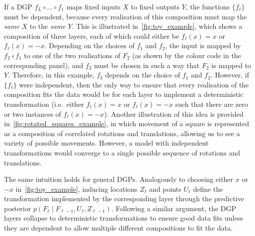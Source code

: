 If a DGP $f_L \circ \ldots \circ f_1$ maps fixed inputs $X$ to fixed outputs $Y$, the functions $\{f_\ell\}$ must be dependent, because every realisation of this composition must map the \emph{same} $X$ to the \emph{same} $Y$.
This is illustrated in~\cref{fig:toy_example}, which shows a composition of three layers, each of which could either be $f_\ell(x) = x$ or $f_\ell(x) = -x$.
Depending on the choices of $f_1$ and $f_2$, the input is mapped by $f_2 \circ f_1$ to one of the two realisations of $F_2$ (as shown by the colour code in the corresponding panel), and $f_3$ must be chosen in such a way that $F_2$ is mapped to $Y$.
Therefore, in this example, $f_3$ depends on the choice of $f_1$ and $f_2$.
However, if $\{f_\ell\}$ were independent, then the only way to ensure that every realisation of the composition fits the data would be for each layer to implement a deterministic transformation (i.e.\ either $f_\ell(x) = x$ or $f_\ell(x) = -x$ such that there are zero or two instances of $f_\ell(x) = -x$).
Another illustration of this idea is provided in~\cref{fig:rotated_squares_example}, in which movement of a square is represented as a composition of correlated rotations and translations, allowing us to see a variety of possible movements.
However, a model with independent transformations would converge to a single possible sequence of rotations and translations.

The same intuition holds for general DGPs. Analogously to choosing either $x$ or $-x$ in~\cref{fig:toy_example}, inducing locations $Z_\ell$ and points $U_\ell$ define the transformation implemented by the corresponding layer through the predictive posterior $p(F_\ell \mid F_{\ell-1}, U_\ell, Z_{\ell-1})$. Following a similar argument, the DGP layers collapse to deterministic transformations to ensure good data fits unless they are dependent to allow multiple different compositions to fit the data.


